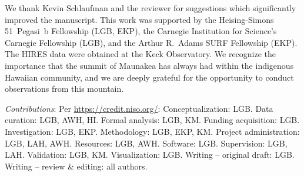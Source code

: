 \documentclass[11pt,twocolumn,tighten]{aastex63}
\begin{document}
\acknowledgements
We thank Kevin Schlaufman and the reviewer for suggestions which significantly improved the 
manuscript.
This work was supported by the Heising-Simons 51~Pegasi~b Fellowship
(LGB, EKP), the Carnegie Institution for Science's Carnegie Fellowship (LGB),
and the Arthur R.~Adams SURF Fellowship (EKP).
The HIRES data were obtained at the Keck Observatory.
We recognize the importance that the summit of Maunakea has always had
within the indigenous Hawaiian community, and we are deeply grateful 
for the opportunity to conduct observations from this mountain.



{\it \large Contributions}: Per \url{https://credit.niso.org/}:
Conceptualization: LGB.
Data curation: LGB, AWH, HI.
Formal analysis: LGB, KM.
Funding acquisition: LGB.
Investigation: LGB, EKP.
Methodology: LGB, EKP, KM.
Project administration: LGB, LAH, AWH.
Resources: LGB, AWH.
Software: LGB.
Supervision: LGB, LAH.
Validation: LGB, KM.
Visualization: LGB.
Writing – original draft: LGB.
Writing – review \& editing: all authors.




\clearpage 
\end{document}

